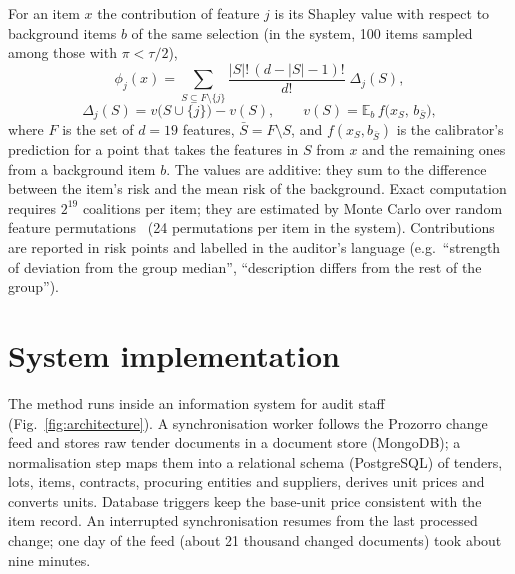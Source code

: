 \documentclass[conference]{IEEEtran}
\begin{document}
For an item $x$ the contribution of feature $j$ is its Shapley value with respect to background items $b$
of the same selection (in the system, 100 items sampled among those with $\pi<\tau/2$),
\begin{equation}
\phi_j(x)=\sum_{S\subseteq F\setminus\{j\}}\frac{|S|!\,(d-|S|-1)!}{d!}\;\Delta_j(S),
\end{equation}
\begin{equation}
\Delta_j(S)=v\bigl(S\cup\{j\}\bigr)-v(S),\qquad v(S)=\mathbb{E}_b\, f\bigl(x_S,\,b_{\bar S}\bigr),
\end{equation}
where $F$ is the set of $d=19$ features, $\bar S=F\setminus S$, and $f(x_S,b_{\bar S})$ is the
calibrator's prediction for a point that takes the features in $S$ from $x$ and the remaining ones from a
background item $b$. The values are additive: they sum to the difference between the item's
risk and the mean risk of the background. Exact computation requires $2^{19}$ coalitions per item; they are
estimated by Monte Carlo over random feature permutations~\cite{strumbelj2014explaining} (24
permutations per item in the system). Contributions are reported in risk points and labelled in
the auditor's language (e.g.\ ``strength of deviation from the group median'', ``description differs
from the rest of the group'').

\section{System implementation}\label{sec:system}

The method runs inside an information system for audit staff (Fig.~\ref{fig:architecture}). A
synchronisation worker follows the Prozorro change feed and stores raw tender documents in a document
store (MongoDB); a normalisation step maps them into a relational schema (PostgreSQL) of tenders, lots,
items, contracts, procuring entities and suppliers, derives unit prices and converts units. Database
triggers keep the base-unit price consistent with the item record. An interrupted synchronisation resumes
from the last processed change; one day of the feed (about 21 thousand changed documents) took about nine
minutes.
\end{document}
